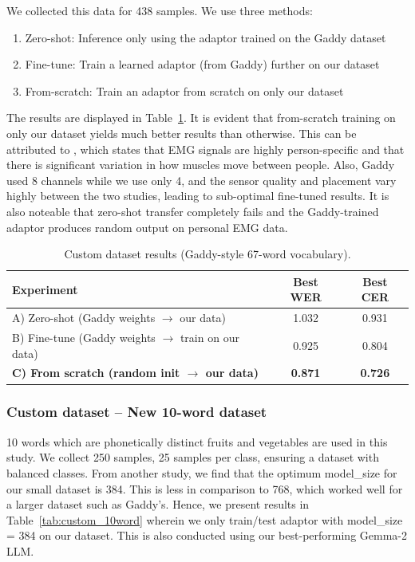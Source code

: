 We collected this data for 438 samples. We use three methods:

\begin{enumerate}
    \item Zero-shot: Inference only using the adaptor trained on the Gaddy dataset
    \item Fine-tune: Train a learned adaptor (from Gaddy) further on our dataset
    \item From-scratch: Train an adaptor from scratch on only our dataset
\end{enumerate}

The results are displayed in Table~\ref{tab:custom_gaddy}. It is evident that from-scratch training on only our dataset yields much better results than otherwise. This can be attributed to \citet{mohapatra2025}, which states that EMG signals are highly person-specific and that there is significant variation in how muscles move between people. Also, Gaddy used 8 channels while we use only 4, and the sensor quality and placement vary highly between the two studies, leading to sub-optimal fine-tuned results. It is also noteable that zero-shot transfer completely fails and the Gaddy-trained adaptor produces random output on personal EMG data.

\begin{table}[ht]
\centering
\caption{Custom dataset results (Gaddy-style 67-word vocabulary).}
\label{tab:custom_gaddy}
\begin{tabular}{lcc}
\toprule
\textbf{Experiment} & \textbf{Best WER} & \textbf{Best CER} \\
\midrule
A) Zero-shot (Gaddy weights $\to$ our data) & 1.032 & 0.931 \\
B) Fine-tune (Gaddy weights $\to$ train on our data) & 0.925 & 0.804 \\
\rowcolor{gray!12} \textbf{C) From scratch (random init $\to$ our data)} & \textbf{0.871} & \textbf{0.726} \\
\bottomrule
\end{tabular}
\end{table}

\subsubsection{Custom dataset -- New 10-word dataset}

10 words which are phonetically distinct fruits and vegetables are used in this study. We collect 250 samples, 25 samples per class, ensuring a dataset with balanced classes. From another study, we find that the optimum model\_size for our small dataset is 384. This is less in comparison to 768, which worked well for a larger dataset such as Gaddy's. Hence, we present results in Table~\ref{tab:custom_10word} wherein we only train/test adaptor with model\_size = 384 on our dataset. This is also conducted using our best-performing Gemma-2 LLM.

